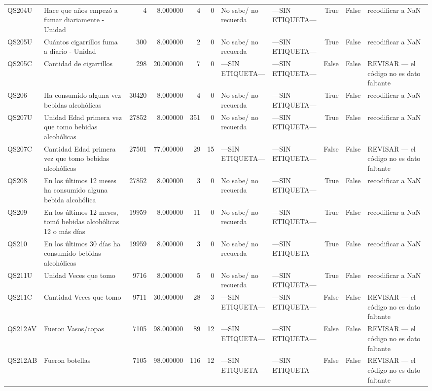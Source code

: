 \begin{longtable}{llrrrrllrrl}
QS204U & Hace que años empezó a fumar diariamente - Unidad & 4 & 8.000000 & 4 & 0 & No sabe/ no recuerda & —SIN ETIQUETA— & True & False & recodificar a NaN \\
QS205U & Cuántos cigarrillos fuma a diario - Unidad & 300 & 8.000000 & 2 & 0 & No sabe/ no recuerda & —SIN ETIQUETA— & True & False & recodificar a NaN \\
QS205C & Cantidad de cigarrillos & 298 & 20.000000 & 7 & 0 & —SIN ETIQUETA— & —SIN ETIQUETA— & False & False & REVISAR — el código no es dato faltante \\
QS206 & Ha consumido alguna vez bebidas alcohólicas & 30420 & 8.000000 & 4 & 0 & No sabe/ no recuerda & —SIN ETIQUETA— & True & False & recodificar a NaN \\
QS207U & Unidad Edad primera vez que tomo bebidas alcohólicas & 27852 & 8.000000 & 351 & 0 & No sabe/ no recuerda & —SIN ETIQUETA— & True & False & recodificar a NaN \\
QS207C & Cantidad  Edad primera vez que tomo bebidas alcohólicas & 27501 & 77.000000 & 29 & 15 & —SIN ETIQUETA— & —SIN ETIQUETA— & False & False & REVISAR — el código no es dato faltante \\
QS208 & En los últimos 12 meses ha consumido alguna bebida alcohólica & 27852 & 8.000000 & 3 & 0 & No sabe/ no recuerda & —SIN ETIQUETA— & True & False & recodificar a NaN \\
QS209 & En los últimos 12 meses, tomó bebidas alcohólicas 12 o más días & 19959 & 8.000000 & 11 & 0 & No sabe/ no recuerda & —SIN ETIQUETA— & True & False & recodificar a NaN \\
QS210 & En los últimos 30 días ha consumido bebidas alcohólicas & 19959 & 8.000000 & 3 & 0 & No sabe/ no recuerda & —SIN ETIQUETA— & True & False & recodificar a NaN \\
QS211U & Unidad Veces que tomo & 9716 & 8.000000 & 5 & 0 & No sabe/ no recuerda & —SIN ETIQUETA— & True & False & recodificar a NaN \\
QS211C & Cantidad Veces que tomo & 9711 & 30.000000 & 28 & 3 & —SIN ETIQUETA— & —SIN ETIQUETA— & False & False & REVISAR — el código no es dato faltante \\
QS212AV & Fueron Vasos/copas & 7105 & 98.000000 & 89 & 12 & —SIN ETIQUETA— & —SIN ETIQUETA— & False & False & REVISAR — el código no es dato faltante \\
QS212AB & Fueron botellas & 7105 & 98.000000 & 116 & 12 & —SIN ETIQUETA— & —SIN ETIQUETA— & False & False & REVISAR — el código no es dato faltante \\

\end{longtable}
